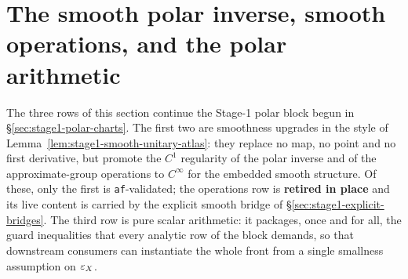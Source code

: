 \section{The smooth polar inverse, smooth operations, and the polar arithmetic}\label{sec:stage1-smooth-upgrades}

The three rows of this section continue the Stage-1 polar block begun in
\S\ref{sec:stage1-polar-charts}. The first two are smoothness upgrades in the style of
Lemma~\ref{lem:stage1-smooth-unitary-atlas}: they replace no map, no point and no first
derivative, but promote the $C^{1}$ regularity of the polar inverse and of the
approximate-group operations to $C^{\infty}$ for the embedded smooth structure. Of these,
only the first is \texttt{af}-validated; the operations row is \textbf{retired in place}
and its live content is carried by the explicit smooth bridge of
\S\ref{sec:stage1-explicit-bridges}. The third row is pure scalar arithmetic: it packages,
once and for all, the guard inequalities that every analytic row of the block demands, so
that downstream consumers can instantiate the whole front from a single smallness
assumption on $\varepsilon_X$.

